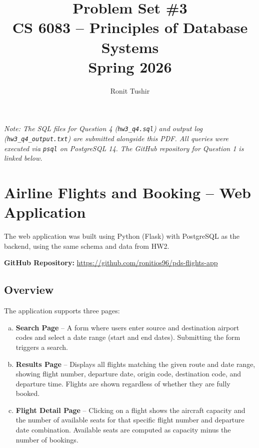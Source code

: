 \documentclass[11pt]{article}
\title{\textbf{Problem Set \#3} \\ CS 6083 -- Principles of Database Systems \\ Spring 2026}
\author{Ronit Tushir}
\date{}
\begin{document}
\maketitle
\thispagestyle{fancy}

\noindent\textit{Note: The SQL files for Question 4 (\texttt{hw3\_q4.sql}) and output log (\texttt{hw3\_q4\_output.txt}) are submitted alongside this PDF. All queries were executed via \texttt{psql} on PostgreSQL 14. The GitHub repository for Question 1 is linked below.}

\section{Airline Flights and Booking -- Web Application}

The web application was built using Python (Flask) with PostgreSQL as the backend, using the same schema and data from HW2.

\medskip
\noindent\textbf{GitHub Repository:} \url{https://github.com/ronitios96/pds-flights-app}

\subsection{Overview}

The application supports three pages:

\begin{enumerate}[(a)]
  \item \textbf{Search Page} -- A form where users enter source and destination airport codes and select a date range (start and end dates). Submitting the form triggers a search.

  \item \textbf{Results Page} -- Displays all flights matching the given route and date range, showing flight number, departure date, origin code, destination code, and departure time. Flights are shown regardless of whether they are fully booked.

  \item \textbf{Flight Detail Page} -- Clicking on a flight shows the aircraft capacity and the number of available seats for that specific flight number and departure date combination. Available seats are computed as capacity minus the number of bookings.
\end{enumerate}
\end{document}
